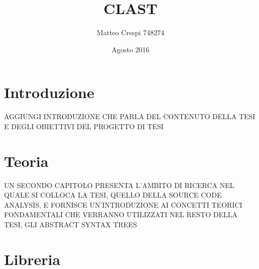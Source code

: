 \documentclass{book}
\title{CLAST}
\author{Matteo Crespi 748274}
\date{Agosto 2016}
\begin{document}
\maketitle

\newpage

\tableofcontents
\listoftables
\listoffigures
\lstlistoflistings

\cleardoublepage

\chapter{Introduzione}

AGGIUNGI INTRODUZIONE CHE PARLA DEL CONTENUTO DELLA TESI E DEGLI OBIETTIVI DEL
PROGETTO DI TESI



\chapter{Teoria}

UN SECONDO CAPITOLO PRESENTA L'AMBITO DI RICERCA NEL QUALE SI COLLOCA LA TESI,
QUELLO DELLA SOURCE CODE ANALYSIS, E FORNISCE UN'INTRODUZIONE AI CONCETTI TEORICI
FONDAMENTALI CHE VERRANNO UTILIZZATI NEL RESTO DELLA TESI, GLI ABSTRACT SYNTAX
TREES









\chapter{Libreria}




\end{document}
